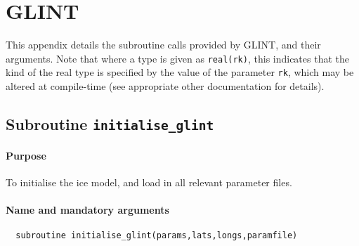 %
\section{GLINT}
This appendix details the subroutine calls provided by GLINT, and their
arguments. Note that where a type is given as \texttt{real(rk)}, this
indicates that the kind of the real type is specified by the value of
the parameter \texttt{rk}, which may be altered at compile-time (see appropriate
other documentation for details).
%
%
\subsection{Subroutine \texttt{initialise\_glint}}
%
\paragraph{Purpose} To initialise the ice model, and load in all relevant parameter files.
%
\paragraph{Name and mandatory arguments}
%
\begin{verbatim}
  subroutine initialise_glint(params,lats,longs,paramfile)
\end{verbatim}
%

